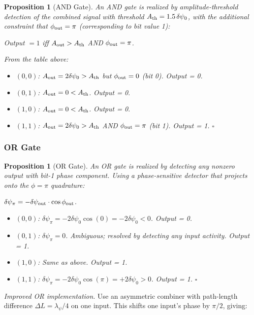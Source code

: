 \documentclass[aps,prd,twocolumn,superscriptaddress,nofootinbib,floatfix]{revtex4-2}
\newtheorem{proposition}[theorem]{Proposition}
\begin{document}
\begin{proposition}[AND Gate]
An AND gate is realized by amplitude-threshold detection of the
combined signal with threshold $A_{\rm th} = 1.5\,\delta\psi_0$,
with the additional constraint that $\phi_{\rm out} = \pi$
(corresponding to bit value 1):

Output $= 1$ iff $A_{\rm out} > A_{\rm th}$ AND $\phi_{\rm out} = \pi$.

From the table above:
\begin{itemize}
\item $(0,0)$: $A_{\rm out} = 2\delta\psi_0 > A_{\rm th}$
  but $\phi_{\rm out} = 0$ (bit 0). Output = 0.
\item $(0,1)$: $A_{\rm out} = 0 < A_{\rm th}$. Output = 0.
\item $(1,0)$: $A_{\rm out} = 0 < A_{\rm th}$. Output = 0.
\item $(1,1)$: $A_{\rm out} = 2\delta\psi_0 > A_{\rm th}$
  AND $\phi_{\rm out} = \pi$ (bit 1). Output = 1. $\square$
\end{itemize}
\end{proposition}

\subsubsection{OR Gate}

\begin{proposition}[OR Gate]
An OR gate is realized by detecting any nonzero output
with bit-1 phase component.  Using a phase-sensitive detector
that projects onto the $\phi = \pi$ quadrature:

$\delta\psi_\pi = -\delta\psi_{\rm out}\cdot\cos\phi_{\rm out}$.

\begin{itemize}
\item $(0,0)$: $\delta\psi_\pi = -2\delta\psi_0\cos(0) = -2\delta\psi_0 < 0$. Output = 0.
\item $(0,1)$: $\delta\psi_\pi = 0$. Ambiguous; resolved by detecting any input activity. Output = 1.
\item $(1,0)$: Same as above. Output = 1.
\item $(1,1)$: $\delta\psi_\pi = -2\delta\psi_0\cos(\pi) = +2\delta\psi_0 > 0$. Output = 1. $\square$
\end{itemize}
\end{proposition}

\emph{Improved OR implementation.}
Use an asymmetric combiner with path-length difference
$\Delta L = \lambda_\psi/4$ on one input.  This shifts one
input's phase by $\pi/2$, giving:
\end{document}
